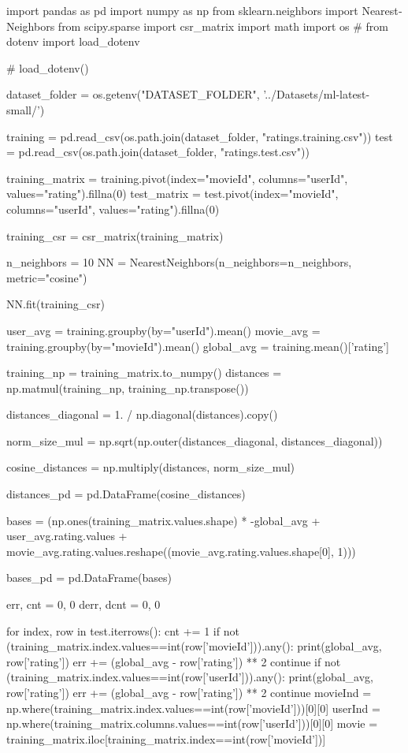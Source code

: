 \begin{latin}
  \begin{python}
import pandas as pd
import numpy as np
from sklearn.neighbors import NearestNeighbors
from scipy.sparse import csr_matrix
import math
import os
#  from dotenv import load_dotenv

#  load_dotenv()

dataset_folder = os.getenv("DATASET_FOLDER", '../Datasets/ml-latest-small/')

training = pd.read_csv(os.path.join(dataset_folder, "ratings.training.csv"))
test = pd.read_csv(os.path.join(dataset_folder, "ratings.test.csv"))

training_matrix = training.pivot(index="movieId", columns="userId",
        values="rating").fillna(0)
test_matrix = test.pivot(index="movieId", columns="userId",
        values="rating").fillna(0)

training_csr = csr_matrix(training_matrix)

n_neighbors = 10
NN = NearestNeighbors(n_neighbors=n_neighbors, metric="cosine")

NN.fit(training_csr)

user_avg = training.groupby(by="userId").mean()
movie_avg = training.groupby(by="movieId").mean()
global_avg = training.mean()['rating']

training_np = training_matrix.to_numpy()
distances = np.matmul(training_np, training_np.transpose())

distances_diagonal = 1. / np.diagonal(distances).copy()

norm_size_mul = np.sqrt(np.outer(distances_diagonal, distances_diagonal))

cosine_distances = np.multiply(distances, norm_size_mul)

distances_pd = pd.DataFrame(cosine_distances)

bases = (np.ones(training_matrix.values.shape) * -global_avg +
        user_avg.rating.values +
        movie_avg.rating.values.reshape((movie_avg.rating.values.shape[0], 1)))

bases_pd = pd.DataFrame(bases)

err, cnt = 0, 0
derr, dcnt = 0, 0

for index, row in test.iterrows():
    cnt += 1
    if not (training_matrix.index.values==int(row['movieId'])).any():
        print(global_avg, row['rating'])
        err += (global_avg - row['rating']) ** 2
        continue
    if not (training_matrix.index.values==int(row['userId'])).any():
        print(global_avg, row['rating'])
        err += (global_avg - row['rating']) ** 2
        continue
    movieInd = np.where(training_matrix.index.values==int(row['movieId']))[0][0]
    userInd = np.where(training_matrix.columns.values==int(row['userId']))[0][0]
    movie = training_matrix.iloc[training_matrix.index==int(row['movieId'])]


\end{python}
\end{latin}
